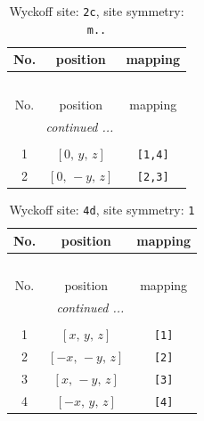 \documentclass[fleqn,8pt]{jsarticle}
\begin{document}
\begin{longtable}{ccc}
\caption{Wyckoff site: {\tt 2c}, site symmetry: {\tt m..}}
 \\
 \hline \hline
No. & position & mapping \\ \hline \endfirsthead

\multicolumn{2}{l}{\tablename\ \thetable{}} \\
 \hline \hline
No. & position & mapping \\ \hline \endhead

 \hline \hline
\multicolumn{2}{r}{\footnotesize\it continued ...} \\ \endfoot

 \hline \hline
\multicolumn{2}{r}{} \\ \endlastfoot

1 & $\left[ 0,\, y,\, z \right]$ & {\tt [1,4]} \\ \hline
2 & $\left[ 0,\, - y,\, z \right]$ & {\tt [2,3]} \\
\end{longtable}
\renewcommand{\arraystretch}{1.2}
\begin{longtable}{ccc}
\caption{Wyckoff site: {\tt 4d}, site symmetry: {\tt 1}}
 \\
 \hline \hline
No. & position & mapping \\ \hline \endfirsthead

\multicolumn{2}{l}{\tablename\ \thetable{}} \\
 \hline \hline
No. & position & mapping \\ \hline \endhead

 \hline \hline
\multicolumn{2}{r}{\footnotesize\it continued ...} \\ \endfoot

 \hline \hline
\multicolumn{2}{r}{} \\ \endlastfoot

1 & $\left[ x,\, y,\, z \right]$ & {\tt [1]} \\ \hline
2 & $\left[ - x,\, - y,\, z \right]$ & {\tt [2]} \\ \hline
3 & $\left[ x,\, - y,\, z \right]$ & {\tt [3]} \\ \hline
4 & $\left[ - x,\, y,\, z \right]$ & {\tt [4]} \\
\end{longtable}
\end{document}
